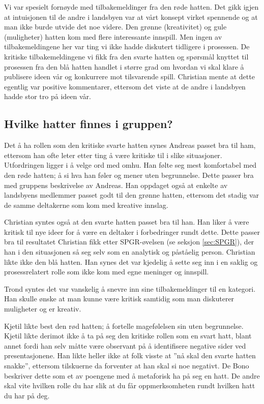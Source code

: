 Vi var spesielt fornøyde med tilbakemeldinger fra den røde hatten. Det gikk igjen at intuisjonen til de andre i landsbyen var at vårt konsept virket spennende og at man ikke burde utvide det noe videre. Den grønne (kreativitet) og gule (muligheter) hatten kom med flere interessante innspill. Men ingen av tilbakemeldingene her var ting vi ikke hadde diskutert tidligere i prosessen. De kritiske tilbakemeldingene vi fikk fra den svarte hatten og spørsmål knyttet til prosessen fra den blå hatten handlet i større grad om hvordan vi skal klare å publisere ideen vår og konkurrere mot tilsvarende spill. Christian mente at dette egentlig var positive kommentarer, ettersom det viste at de andre i landsbyen hadde stor tro på ideen vår. 


\subsection{Hvilke hatter finnes i gruppen?}
Det å ha rollen som den kritiske svarte hatten synes Andreas passet bra til ham, ettersom han ofte leter etter ting å være kritiske til i slike situasjoner. Utfordringen ligger i å velge ord med omhu. Han følte seg mest komfortabel med den røde hatten; å si hva han føler og mener uten begrunnelse. Dette passer bra med gruppens beskrivelse av Andreas. Han oppdaget også at enkelte av landsbyens medlemmer passet godt til den grønne hatten, ettersom det stadig var de samme deltakerne som kom med kreative innslag.

Christian syntes også at den svarte hatten passet bra til han. Han liker å være kritisk til nye ideer for å være en deltaker i forbedringer rundt dette. Dette passer bra til resultatet Christian fikk etter SPGR-øvelsen (se seksjon \ref{sec:SPGR}), der han i den situasjonen så seg selv som en analytisk og påståelig person. Christian likte ikke den blå hatten. Han synes det var kjedelig å sette seg inn i en saklig og prosessrelatert rolle som ikke kom med egne meninger og innspill.

Trond syntes det var vanskelig å snevre inn sine tilbakemeldinger til en kategori. Han skulle ønske at man kunne være kritisk samtidig som man diskuterer muligheter og er kreativ. 

Kjetil likte best den rød hatten; å fortelle magefølelsen sin uten begrunnelse. Kjetil likte derimot ikke å ta på seg den kritiske rollen som en svart hatt, blant annet fordi han selv måtte være observant på å identifisere negative sider ved presentasjonene. Han likte heller ikke at folk visste at ''nå skal den svarte hatten snakke'', ettersom tilskuerne da forventer at han skal si noe negativt. De Bono beskriver dette som et av poengene med å metaforisk ha på seg en hatt. De andre skal vite hvilken rolle du har slik at du får oppmerksomheten rundt hvilken hatt du har på deg. 

